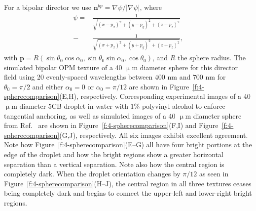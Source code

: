 For a bipolar director we use $\mathbf{n}^{bp} = \nabla \psi/|\nabla \psi|$, where
\begin{align}
\psi =& \frac{1}{\sqrt{(x-p_x)^2+(y-p_y)^2+(z-p_z)^2}} \nonumber \\
      -& \frac{1}{\sqrt{(x+p_x)^2+(y+p_y)^2+(z+p_z)^2}}, \label{e:4-bipolar_pot}
\end{align}
with $\mathbf{p} = R(\sin \theta_0\cos\alpha_0,\sin \theta_0\sin\alpha_0,\cos\theta_0) $, and $R$ the sphere radius.
The simulated bipolar OPM texture of a 40 $\upmu$m diameter sphere for this director field using 20 evenly-spaced wavelengths between $400$ nm and $700$ nm for $\theta_0 = \pi/2$ and either $\alpha_0 = 0$ or $\alpha_0 = \pi/12$ are shown in Figure~\ref{f:4-spherecomparison}(E,H), respectively.
Corresponding experimental images of a 40 $\upmu$m diameter 5CB droplet in water with $1\%$ polyvinyl alcohol to enforce tangential anchoring, as well as simulated images of a 40 $\upmu$m diameter sphere from Ref.~\cite{RN310} are shown in Figure~\ref{f:4-spherecomparison}(F,I) and Figure~\ref{f:4-spherecomparison}(G,J), respectively.
All six images exhibit excellent agreement.
Note how Figure~\ref{f:4-spherecomparison}(E--G) all have four bright portions at the edge of the droplet and how the bright regions show a greater horizontal separation than a vertical separation.
Note also how the central region is completely dark.
When the droplet orientation changes by $\pi/12$ as seen in Figure~\ref{f:4-spherecomparison}(H--J), the central region in all three textures ceases being completely dark and begins to connect the upper-left and lower-right bright regions.


